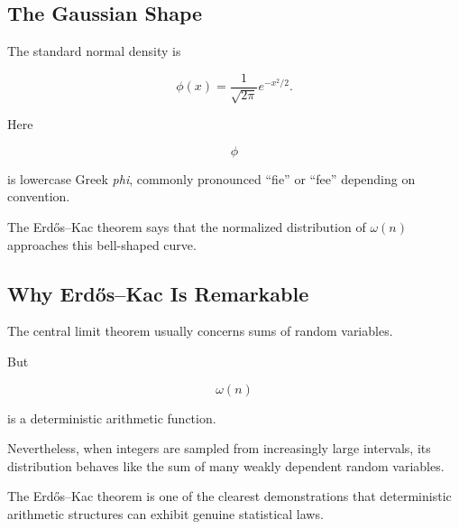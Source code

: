 \subsection{The Gaussian Shape}
\label{subsec:erdos-kac-gaussian-visual}

The standard normal density is

\[ \phi(x)=\frac1{\sqrt{2\pi}}e^{-x^2/2}. \]

Here

\[ \phi \]

is lowercase Greek \emph{phi}, commonly pronounced ``fie'' or ``fee''
depending on convention.

\begin{centereddiagram}
\end{centereddiagram}

The Erdős--Kac theorem says that the normalized distribution of
\(\omega(n)\) approaches this bell-shaped curve.

\subsection{Why Erdős--Kac Is Remarkable}
\label{subsec:why-erdos-kac-remarkable}

The central limit theorem usually concerns sums of random variables.

But

\[ \omega(n) \]

is a deterministic arithmetic function.

Nevertheless, when integers are sampled from increasingly large intervals,
its distribution behaves like the sum of many weakly dependent random
variables.

\begin{importantbox}
The Erdős--Kac theorem is one of the clearest demonstrations that deterministic
arithmetic structures can exhibit genuine statistical laws.
\end{importantbox}

